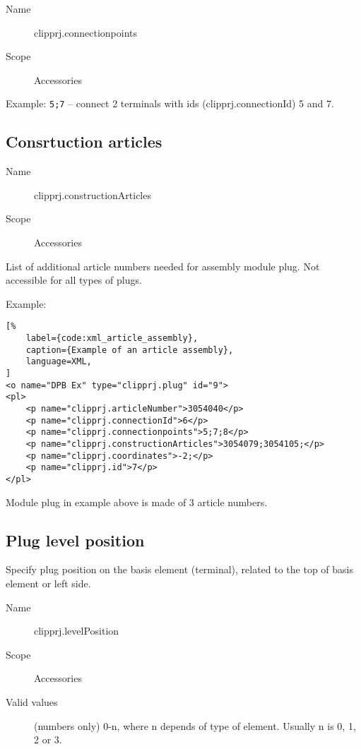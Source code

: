 \documentclass[%
	a4paper,
	oneside,
	listof=numbered,
	parskip=half,
	headsepline=true,
	footsepline=false,
	normalheadings,
	0.7headlines,
	headexclude,
	]{scrbook}
\begin{document}
\begin{description}
	\item[Name] clipprj.connectionpoints
	\item[Scope] Accessories
\end{description}

Example: \verb|5;7| – connect 2 terminals with ids (clipprj.connectionId) 5 and 7.

\subsection{Consrtuction articles}

\begin{description}
	\item[Name] clipprj.constructionArticles
	\item[Scope] Accessories
\end{description}

List of additional article numbers needed for assembly module plug. Not accessible for all types of plugs.

Example:

\begin{lstlisting}[%
	label={code:xml_article_assembly},
	caption={Example of an article assembly},
	language=XML,
]
<o name="DPB Ex" type="clipprj.plug" id="9">
<pl>
	<p name="clipprj.articleNumber">3054040</p>
	<p name="clipprj.connectionId">6</p>
	<p name="clipprj.connectionpoints">5;7;8</p>
	<p name="clipprj.constructionArticles">3054079;3054105;</p>
	<p name="clipprj.coordinates">-2;</p>
	<p name="clipprj.id">7</p>
</pl>
\end{lstlisting}

Module plug in example above is made of 3 article numbers.

\subsection{Plug level position}

Specify plug position on the basis element (terminal), related to the top of
basis element or left side.

\begin{description}
	\item[Name] clipprj.levelPosition
	\item[Scope] Accessories
	\item[Valid values] (numbers only) 0-n, where n depends of type of element. Usually n is 0, 1, 2 or 3.
\end{description}
\end{document}
